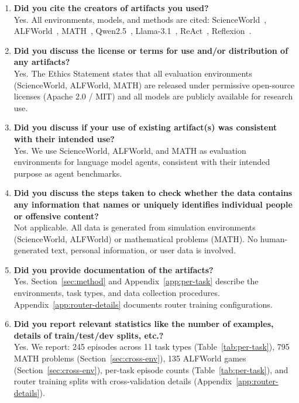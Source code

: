 \begin{enumerate}
\item[\textbf{B1.}] \textbf{Did you cite the creators of artifacts you used?}\\
Yes. All environments, models, and methods are cited: ScienceWorld~\cite{scienceworld-2022}, ALFWorld~\cite{alfworld-2021}, MATH~\cite{math-2021}, Qwen2.5~\cite{qwen25-2024}, Llama-3.1~\cite{llama3-2024}, ReAct~\cite{react-2023}, Reflexion~\cite{reflexion-2023}.

\item[\textbf{B2.}] \textbf{Did you discuss the license or terms for use and/or distribution of any artifacts?}\\
Yes. The Ethics Statement states that all evaluation environments (ScienceWorld, ALFWorld, MATH) are released under permissive open-source licenses (Apache 2.0 / MIT) and all models are publicly available for research use.

\item[\textbf{B3.}] \textbf{Did you discuss if your use of existing artifact(s) was consistent with their intended use?}\\
Yes. We use ScienceWorld, ALFWorld, and MATH as evaluation environments for language model agents, consistent with their intended purpose as agent benchmarks.

\item[\textbf{B4.}] \textbf{Did you discuss the steps taken to check whether the data contains any information that names or uniquely identifies individual people or offensive content?}\\
Not applicable. All data is generated from simulation environments (ScienceWorld, ALFWorld) or mathematical problems (MATH). No human-generated text, personal information, or user data is involved.

\item[\textbf{B5.}] \textbf{Did you provide documentation of the artifacts?}\\
Yes. Section~\ref{sec:method} and Appendix~\ref{app:per-task} describe the environments, task types, and data collection procedures. Appendix~\ref{app:router-details} documents router training configurations.

\item[\textbf{B6.}] \textbf{Did you report relevant statistics like the number of examples, details of train/test/dev splits, etc.?}\\
Yes. We report: 245 episodes across 11 task types (Table~\ref{tab:per-task}), 795 MATH problems (Section~\ref{sec:cross-env}), 135 ALFWorld games (Section~\ref{sec:cross-env}), per-task episode counts (Table~\ref{tab:per-task}), and router training splits with cross-validation details (Appendix~\ref{app:router-details}).
\end{enumerate}

